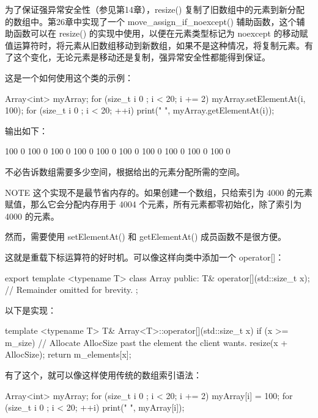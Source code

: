 为了保证强异常安全性（参见第14章），resize() 复制了旧数组中的元素到新分配的数组中。第26章中实现了一个 move\_assign\_if\_noexcept() 辅助函数，这个辅助函数可以在 resize() 的实现中使用，以便在元素类型标记为 noexcept 的移动赋值运算符时，将元素从旧数组移动到新数组，如果不是这种情况，将复制元素。有了这个变化，无论元素是移动还是复制，强异常安全性都能得到保证。

这是一个如何使用这个类的示例：

\begin{cpp}
Array<int> myArray;
for (size_t i { 0 }; i < 20; i += 2) {
    myArray.setElementAt(i, 100);
}
for (size_t i { 0 }; i < 20; ++i) {
    print("{} ", myArray.getElementAt(i));
}
\end{cpp}

输出如下：

\begin{shell}
100 0 100 0 100 0 100 0 100 0 100 0 100 0 100 0 100 0 100 0
\end{shell}

不必告诉数组需要多少空间，根据给出的元素分配所需的空间。

\begin{myNotic}{NOTE}
这个实现不是最节省内存的。如果创建一个数组，只给索引为 4000 的元素赋值，那么它会分配内存用于 4004 个元素，所有元素都零初始化，除了索引为 4000 的元素。
\end{myNotic}

然而，需要使用 setElementAt() 和 getElementAt() 成员函数不是很方便。

这就是重载下标运算符的好时机。可以像这样向类中添加一个 operator[]：

\begin{cpp}
export template <typename T>
class Array
{
    public:
        T& operator[](std::size_t x);
        // Remainder omitted for brevity.
};
\end{cpp}

以下是实现：

\begin{cpp}
template <typename T> T& Array<T>::operator[](std::size_t x)
{
    if (x >= m_size) {
        // Allocate AllocSize past the element the client wants.
        resize(x + AllocSize);
    }
    return m_elements[x];
}
\end{cpp}

有了这个，就可以像这样使用传统的数组索引语法：

\begin{cpp}
Array<int> myArray;
for (size_t i { 0 }; i < 20; i += 2) {
    myArray[i] = 100;
}
for (size_t i { 0 }; i < 20; ++i) {
    print("{} ", myArray[i]);
}
\end{cpp}

